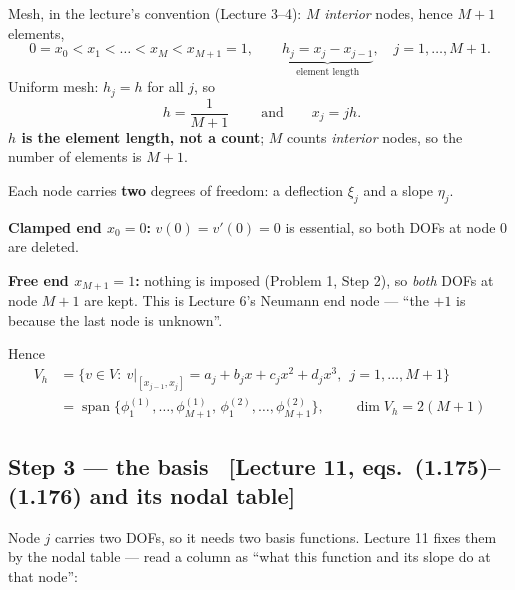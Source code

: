 \documentclass[11pt]{article}
\newcommand{\src}[1]{{\small\color{black!55}\textsf{[#1]}}}
\begin{document}
\begin{steps}
\item Mesh, in the lecture's convention (Lecture 3--4): $M$ \emph{interior}
      nodes, hence $M+1$ elements,
\begin{equation}\label{eq:mesh}
  0=x_{0}<x_{1}<\dots<x_{M}<x_{M+1}=1,
  \qquad \underbrace{h_{j}=x_{j}-x_{j-1}}_{\text{element length}},
  \quad j=1,\dots,M+1 .
\end{equation}
      Uniform mesh: $h_{j}=h$ for all $j$, so
\begin{equation}\label{eq:huni}
  \boxed{\;h=\frac{1}{M+1}\;}\qquad\text{and}\qquad x_{j}=jh .
\end{equation}
      \textbf{$h$ is the element length, not a count};
      $M$ counts \emph{interior} nodes, so the number of elements is $M+1$.
\item Each node carries \textbf{two} degrees of freedom: a deflection $\xi_{j}$
      and a slope $\eta_{j}$.
\item \textbf{Clamped end $x_{0}=0$:} $v(0)=v'(0)=0$ is essential, so both DOFs
      at node $0$ are deleted.
\item \textbf{Free end $x_{M+1}=1$:} nothing is imposed (Problem 1, Step 2),
      so \emph{both} DOFs at node $M+1$ are kept.  This is Lecture 6's Neumann
      end node --- ``the $+1$ is because the last node is unknown''.
\item Hence
\begin{equation}\label{eq:Vh}
  \boxed{\;
  \begin{aligned}
    V_{h}&=\bigl\{v\in V:\ v|_{[x_{j-1},x_{j}]}=a_{j}+b_{j}x+c_{j}x^{2}+d_{j}x^{3},
           \ \ j=1,\dots,M+1\bigr\}\\[2pt]
         &=\operatorname{span}\bigl\{\phi^{(1)}_{1},\dots,\phi^{(1)}_{M+1},\,
           \phi^{(2)}_{1},\dots,\phi^{(2)}_{M+1}\bigr\},
           \qquad \dim V_{h}=2(M+1)
  \end{aligned}\;}
\end{equation}
\end{steps}

\subsection*{Step 3 --- the basis
  \ \src{Lecture 11, eqs.~(1.175)--(1.176) and its nodal table}}

Node $j$ carries two DOFs, so it needs two basis functions.  Lecture 11 fixes
them by the nodal table --- read a column as ``what this function and its slope
do at that node'':
\end{document}
